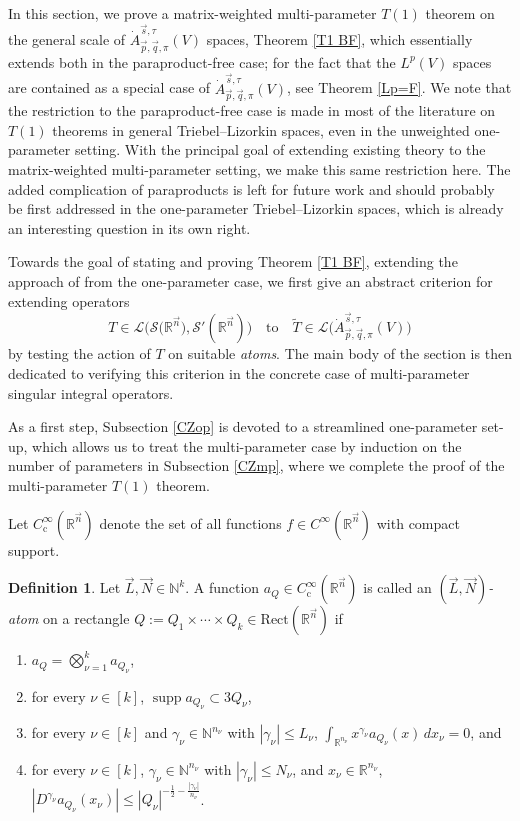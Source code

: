 \documentclass[11pt, reqno]{amsart}
\theoremstyle{definition}
\newtheorem{definition}[theorem]{Definition}
\theoremstyle{remark}
\numberwithin{equation}{section}
\newcommand{\N}{\mathbb N}
\newcommand{\vp}{\vec p}
\newcommand{\vq}{\vec q}
\newcommand{\vs}{\vec s}
\newcommand{\Atau}{\dot A^{\vs,\tau}_{\vp,\vq,\pi}}
\newcommand{\Rect}{\mathrm{Rect}}
\begin{document}
In this section, we prove a matrix-weighted multi-parameter $T(1)$ theorem on the general scale of $\Atau(V)$ spaces, Theorem \ref{T1 BF}, which essentially extends both \cite{BHYY:1c,DKPS} in the paraproduct-free case; for the fact that the $L^p(V)$ spaces are contained as a special case of $\Atau(V)$, see Theorem \ref{Lp=F}. We note that the restriction to the paraproduct-free case is made in most of the literature on $T(1)$ theorems in general Triebel--Lizorkin spaces, even in the unweighted one-parameter setting. With the principal goal of extending existing theory to the matrix-weighted multi-parameter setting, we make this same restriction here. The added complication of paraproducts is left for future work and should probably be first addressed in the one-parameter Triebel--Lizorkin spaces, which is already an interesting question in its own right.

Towards the goal of stating and proving Theorem \ref{T1 BF}, extending the approach of \cite{BHYY:1c} from the one-parameter case, we first give an abstract criterion for extending operators
$$T\in\mathcal L\Big(\mathscr{S}\big(\mathbb R^{\vec n}\big),\mathscr{S}'(\mathbb R^{\vec n})\Big)
\quad\mathrm{to}\quad \widetilde T\in\mathcal L\Big(\dot A^{\vec s,\tau}_{\vec p,\vec q,\pi}(V)\Big)$$
by testing the action of $T$ on suitable {\em atoms}. The main body of the section is then dedicated to verifying this criterion in the concrete case of multi-parameter singular integral operators.

As a first step, Subsection \ref{CZop} is devoted to a streamlined one-parameter set-up, which allows us to
treat the multi-parameter case by induction on the number of parameters in Subsection \ref{CZmp}, where we complete the proof of the multi-parameter $T(1)$ theorem.

Let $C_{\mathrm{c}}^\infty(\mathbb R^{\vec n})$ denote
the set of all functions $f\in C^\infty(\mathbb R^{\vec n})$ with compact support.

\begin{definition}\label{def:atom}
Let $\vec L,\vec N\in\N^k$.
A function $a_Q\in C_{\mathrm{c}}^\infty(\mathbb R^{\vec n})$
is called an \emph{$(\vec L,\vec N)$-atom} on a rectangle $Q:=Q_1\times\cdots\times Q_k\in\Rect(\mathbb R^{\vec n})$ if
\begin{enumerate}[\rm(i)]
\item\label{it:aForm}
$a_Q= \bigotimes_{\nu=1}^k a_{Q_\nu}$,

\item\label{it:aSupp}
for every $\nu\in[k]$,
$\operatorname{supp}a_{Q_\nu}\subset3Q_\nu$,

\item\label{it:aCanc}
for every $\nu\in[k]$ and $\gamma_\nu\in\N^{n_\nu}$ with $|\gamma_\nu|\leq L_\nu$,
$\int_{\mathbb{R}^{n_\nu}}x^{\gamma_\nu} a_{Q_\nu}(x)\,dx_\nu=0$, and

\item\label{it:aSize}
for every $\nu\in[k]$,
$\gamma_\nu\in\N^{n_\nu}$ with $|\gamma_\nu|\leq N_\nu$,
and $x_\nu\in\mathbb{R}^{n_\nu}$,
$|D^{\gamma_\nu} a_{Q_\nu}(x_\nu)|\leq|Q_\nu|^{-\frac12-\frac{|\gamma_\nu|}{n_\nu}}$.
\end{enumerate}
\end{definition}
\end{document}
